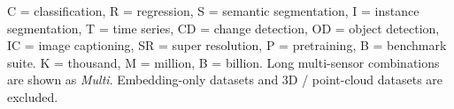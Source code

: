 \begin{center}\begin{minipage}{0.988\textwidth}\fontsize{5.7}{6.8}\selectfont
C = classification, R = regression, S = semantic segmentation, I = instance segmentation, T = time series, CD = change detection, OD = object detection, IC = image captioning, SR = super resolution, P = pretraining, B = benchmark suite. K = thousand, M = million, B = billion. Long multi-sensor combinations are shown as \emph{Multi}. Embedding-only datasets and 3D / point-cloud datasets are excluded.
\end{minipage}\end{center}
\endgroup\restoregeometry